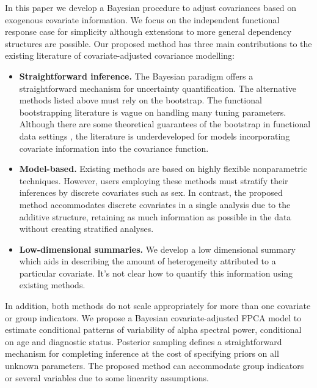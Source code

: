\documentclass[useAMS,referee,usenatbib]{biom}
\begin{document}
In this paper we develop a Bayesian procedure to adjust covariances based on exogenous covariate information. We focus on the independent functional response case for simplicity although extensions to more general dependency structures are possible. Our proposed method has three main contributions to the existing literature of covariate-adjusted covariance modelling:
\begin{itemize}
	\item \textbf{Straightforward inference.} The Bayesian paradigm offers a straightforward mechanism for uncertainty quantification. The alternative methods listed above must rely on the bootstrap. The functional bootstrapping literature is vague on handling many tuning parameters. Although there are some theoretical guarantees of the bootstrap in functional data settings \citep{Cuevas2006}, the literature is underdeveloped for models incorporating covariate information into the covariance function.
	\item \textbf{Model-based.} Existing methods are based on highly flexible nonparametric techniques. However, users employing these methods must stratify their inferences by discrete covariates such as sex. In contrast, the proposed method accommodates discrete covariates in a single analysis due to the additive structure, retaining as much information as possible in the data without creating stratified analyses. 
	\item \textbf{Low-dimensional summaries.} We develop a low dimensional summary which aids in describing the amount of heterogeneity attributed to a particular covariate. It's not clear how to quantify this information using existing methods.
\end{itemize}
In addition, both methods do not scale appropriately for more than one covariate or group indicators. We propose a Bayesian covariate-adjusted FPCA model to estimate conditional patterns of variability of alpha spectral power, conditional on age and diagnostic status. Posterior sampling defines a straightforward mechanism for completing inference at the cost of specifying priors on all unknown parameters. The proposed method can accommodate group indicators or several variables due to some linearity assumptions. 
\end{document}
